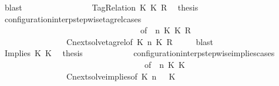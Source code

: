 \begin{isabellebody}
\ blast\isanewline
\ \ \ \ \ \ \isamarkupfalse%
\isanewline
\ \ \ \ \ \ \ \ \isamarkupfalse%
\ {\isacharparenleft}TagRelation\ K\ K\ R{\isacharparenright}\ \isamarkupfalse%
\ {\isacharquery}thesis\isanewline
\ \ \ \ \ \ \ \ \ \ \isamarkupfalse%
\ configuration{\isacharunderscore}interp{\isacharunderscore}stepwise{\isacharunderscore}tagrel{\isacharunderscore}cases\isanewline
\ \ \ \ \ \ \ \ \ \ \ \ \ \ \ \ \ \ \ \ \ \ \ \ \ \ \ \ \ \ \ \ \ \ {\isacharbrackleft}of\ {\isacartoucheopen}{\isasymGamma}{\isacartoucheclose}\ {\isacartoucheopen}n{\isacartoucheclose}\ {\isacartoucheopen}K\ {\isacartoucheopen}K\ {\isacartoucheopen}R{\isacartoucheclose}\ {\isacartoucheopen}{\isasymPsi}{\isacartoucheclose}\ {\isacartoucheopen}{\isasymPhi}{\isacartoucheclose}{\isacharbrackright}\isanewline
\ \ \ \ \ \ \ \ \ \ \ \ \ \ \ \ Cnext{\isacharunderscore}solve{\isacharunderscore}tagrel{\isacharbrackleft}of\ {\isacartoucheopen}K\ {\isacartoucheopen}n{\isacartoucheclose}\ {\isacartoucheopen}K\ {\isacartoucheopen}R{\isacartoucheclose}\ {\isacartoucheopen}{\isasymGamma}{\isacartoucheclose}\ {\isacartoucheopen}{\isasymPsi}{\isacartoucheclose}\ {\isacartoucheopen}{\isasymPhi}{\isacartoucheclose}{\isacharbrackright}\ \isamarkupfalse%
\ blast\isanewline
\ \ \ \ \ \ \isamarkupfalse%
\isanewline
\ \ \ \ \ \ \ \ \isamarkupfalse%
\ {\isacharparenleft}Implies\ K{}\ K{}{\isacharparenright}\ \isamarkupfalse%
\ {\isacharquery}thesis\isanewline
\ \ \ \ \ \ \ \ \ \ \isamarkupfalse%
\ configuration{\isacharunderscore}interp{\isacharunderscore}stepwise{\isacharunderscore}implies{\isacharunderscore}cases\isanewline
\ \ \ \ \ \ \ \ \ \ \ \ \ \ \ \ \ \ \ \ \ \ \ \ \ \ \ \ \ \ \ \ \ \ \ {\isacharbrackleft}of\ {\isacartoucheopen}{\isasymGamma}{\isacartoucheclose}\ {\isacartoucheopen}n{\isacartoucheclose}\ {\isacartoucheopen}K{}{\isacartoucheclose}\ {\isacartoucheopen}K{}{\isacartoucheclose}\ {\isacartoucheopen}{\isasymPsi}{\isacartoucheclose}\ {\isacartoucheopen}{\isasymPhi}{\isacartoucheclose}{\isacharbrackright}\isanewline
\ \ \ \ \ \ \ \ \ \ \ \ \ \ \ \ Cnext{\isacharunderscore}solve{\isacharunderscore}implies{\isacharbrackleft}of\ {\isacartoucheopen}K{}{\isacartoucheclose}\ {\isacartoucheopen}n{\isacartoucheclose}\ {\isacartoucheopen}{\isasymGamma}{\isacartoucheclose}\ {\isacartoucheopen}{\isasymPsi}{\isacartoucheclose}\ {\isacartoucheopen}K{}{\isacartoucheclose}\ {\isacartoucheopen}{\isasymPhi}{\isacartoucheclose}{\isacharbrackright}\ \isamarkupfalse%

\end{isabellebody}
